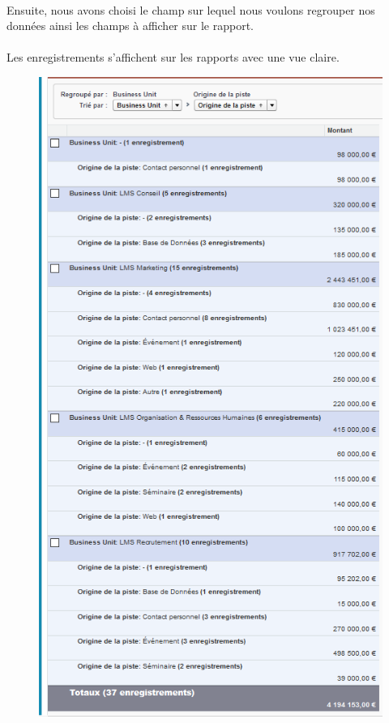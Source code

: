 \documentclass[a4paper, 12pt]{report}
\begin{document}
\begin{itemize}
\paragraph{}
Ensuite, nous avons choisi le champ sur lequel nous voulons regrouper nos données ainsi les champs à afficher sur le rapport.
\paragraph{}
Les enregistrements s'affichent sur les rapports avec une vue claire.
\begin{figure}[H]
	\centering
		\includegraphics{resultatfiltrage.PNG}
	\label{fig:resultatfiltrage}
\end{figure}

\end{itemize}
\end{document}
